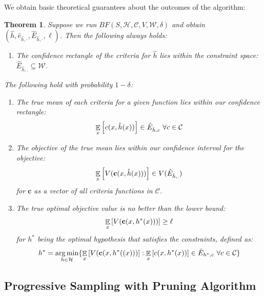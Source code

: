 \documentclass{article}
\newtheorem{theorem}{Theorem}[section]
\newcommand{\expectation}[2][]{\mathop{\mathbb{E}}\displaylimits_{#1}\left[ #2 \right]}
\DeclareMathOperator*{\argmin}{arg\,min}
\begin{document}
{\begin{algorithm}
\begin{algorithmic}[1]
    \end{algorithmic}
\end{algorithm}

We obtain basic theoretical guarantees about the outcomes of the algorithm:

\begin{theorem}
    Suppose we run $BF(S, \mathcal{H}, \mathcal{C}, V, \mathcal{W}, \delta)$ and obtain $(\hat{h}, \hat{e}_{\hat{h}, \cdot}, \hat{E}_{\hat{h}, \cdot}, \ell)$. Then the following always holds:
    \begin{enumerate}
        \item The confidence rectangle of the criteria for $\hat{h}$ lies within the constraint space: $\hat{E}_{\hat{h},.} \subseteq \mathcal{W}$.
    \end{enumerate}
    The following hold with probability $1 - \delta$:
    \begin{enumerate}[resume]
        \item The true mean of each criteria for a given function lies within our confidence rectangle: 
        \[\expectation[x]{c(x,\hat{h}(x))} \in \hat{E}_{\hat{h}, c} \ \forall c \in \mathcal{C}\]
        \item The objective of the true mean lies within our confidence interval for the objective:
        \[\expectation[x]{V(\textbf{c}(x,\hat{h}(x)))} \in V(\hat{E}_{\hat{h},.})\] 
        for $\textbf{c}$ as a vector of all criteria functions in $\mathcal{C}$.
        \item The true optimal objective value is no better than the lower bound: 
        \[\expectation[x]{V(\textbf{c}(x,h^*(x)))} \geq \ell \]
        for $h^*$ being the optimal hypothesis that satisfies the constraints, defined as: \[h^* = \argmin_{h \in \mathcal{H}}\{\expectation[x]{V(\textbf{c}(x,h^*((x)))}: \expectation[x]{c(x,h^*(x))} \in \hat{E}_{h^*, c} \ \forall c \in \mathcal{C} \}\]
    \end{enumerate}
\end{theorem}

\subsection{Progressive Sampling with Pruning Algorithm}\label{psp}

}
\end{document}
